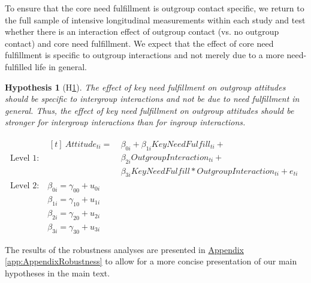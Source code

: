 \documentclass[man, 12pt, a4paper, mask]{apa7}
\theoremstyle{break}
\theoremstyle{plain}
\newtheorem{hyp}{Hypothesis}
\newcommand{\appref}[2][]{\hyperref[#2]{Appendix \ref*{#2}#1}}
\begin{document}
To ensure that the core need fulfillment is outgroup contact specific, we return to the full sample of intensive longitudinal measurements within each study and test whether there is an interaction effect of outgroup contact (vs. no outgroup contact) and core need fulfillment. We expect that the effect of core need fulfillment is specific to outgroup interactions and not merely due to a more need-fulfilled life in general.

\begin{mdframed}[style=mdfhypothesis]
    \begin{hyp}[H\ref{hyp:keyNeedContactType}] \label{hyp:keyNeedContactType}
    \addtolength{\leftskip}{1em}
    The effect of key need fulfillment on outgroup attitudes should be specific to intergroup interactions and not be due to need fulfillment in general. Thus, the effect of key need fulfillment on outgroup attitudes should be stronger for intergroup interactions than for ingroup interactions. 
    \end{hyp}
    
    \begin{fleqn}[\eqskip-\subhypskip]
      \begin{equation} \label{eq:SlopesAttCoreXContact}
        \begin{split}
          \textrm{Level 1:} &
            \begin{aligned}[t]
              \ Attitude_{ti} =  &\ \beta_{0i} + \beta_{1i}KeyNeedFulfill_{ti} + \\
                                 &\ \beta_{2i}OutgroupInteraction_{ti} + \\
                                 &\ \beta_{3i}KeyNeedFulfill*OutgroupInteraction_{ti} + e_{ti}
            \end{aligned} \\
          \textrm{Level 2:} &\ \beta_{0i} = \gamma_{00} + u_{0i} \\
                            &\ \beta_{1i} = \gamma_{10} + u_{1i} \\
                            &\ \beta_{2i} = \gamma_{20} + u_{2i} \\
                            &\ \beta_{3i} = \gamma_{30} + u_{3i}
        \end{split} 
      \end{equation}
    \end{fleqn}
\end{mdframed}
The results of the robustness analyses are presented in \appref{app:AppendixRobustness} to allow for a more concise presentation of our main hypotheses in the main text.
\end{document}
